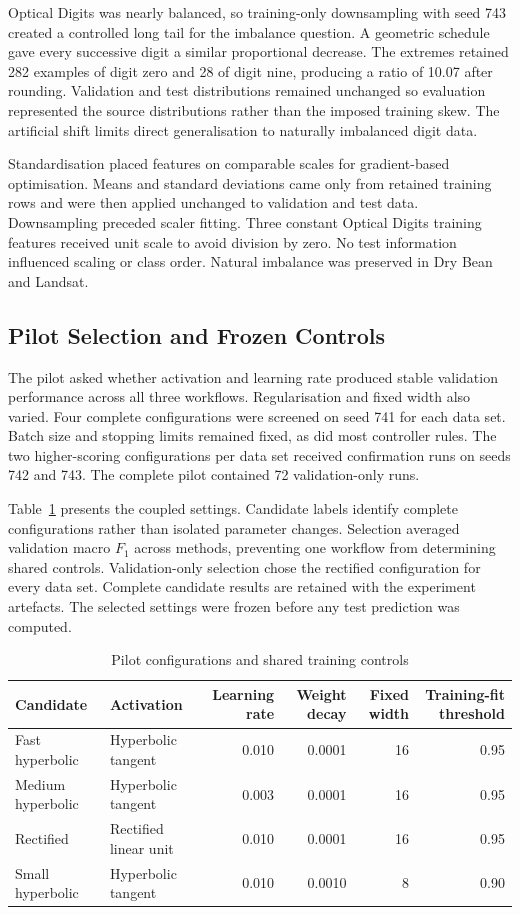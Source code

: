 \documentclass[conference,10pt]{IEEEtran}
\begin{document}
Optical Digits was nearly balanced, so training-only downsampling with seed 743 created a controlled long tail for the imbalance question. A geometric schedule gave every successive digit a similar proportional decrease. The extremes retained 282 examples of digit zero and 28 of digit nine, producing a ratio of 10.07 after rounding. Validation and test distributions remained unchanged so evaluation represented the source distributions rather than the imposed training skew. The artificial shift limits direct generalisation to naturally imbalanced digit data.

Standardisation placed features on comparable scales for gradient-based optimisation. Means and standard deviations came only from retained training rows and were then applied unchanged to validation and test data. Downsampling preceded scaler fitting. Three constant Optical Digits training features received unit scale to avoid division by zero. No test information influenced scaling or class order. Natural imbalance was preserved in Dry Bean and Landsat.

\subsection{Pilot Selection and Frozen Controls}

The pilot asked whether activation and learning rate produced stable validation performance across all three workflows. Regularisation and fixed width also varied. Four complete configurations were screened on seed 741 for each data set. Batch size and stopping limits remained fixed, as did most controller rules. The two higher-scoring configurations per data set received confirmation runs on seeds 742 and 743. The complete pilot contained 72 validation-only runs.

Table~\ref{tab:search} presents the coupled settings. Candidate labels identify complete configurations rather than isolated parameter changes. Selection averaged validation macro $F_1$ across methods, preventing one workflow from determining shared controls. Validation-only selection chose the rectified configuration for every data set. Complete candidate results are retained with the experiment artefacts. The selected settings were frozen before any test prediction was computed.

\begin{table}[t]
\caption{Pilot configurations and shared training controls}
\label{tab:search}
\centering
\begin{tabular}{@{}llrrrr@{}}
\toprule
Candidate & Activation & Learning rate & Weight decay & Fixed width & Training-fit threshold \\
\midrule
Fast hyperbolic & Hyperbolic tangent & 0.010 & 0.0001 & 16 & 0.95 \\
Medium hyperbolic & Hyperbolic tangent & 0.003 & 0.0001 & 16 & 0.95 \\
Rectified & Rectified linear unit & 0.010 & 0.0001 & 16 & 0.95 \\
Small hyperbolic & Hyperbolic tangent & 0.010 & 0.0010 & 8 & 0.90 \\
\bottomrule
\end{tabular}
\end{table}
\end{document}
